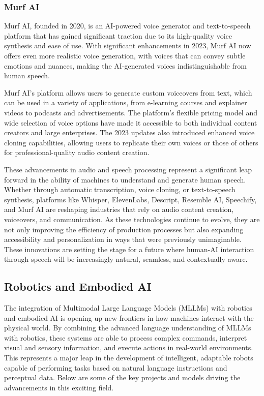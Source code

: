 \subsubsection{Murf AI}

Murf AI, founded in 2020, is an AI-powered voice generator and text-to-speech platform that has gained significant traction due to its high-quality voice synthesis and ease of use. 
With significant enhancements in 2023, Murf AI now offers even more realistic voice generation, with voices that can convey subtle emotions and nuances, making the AI-generated voices indistinguishable from human speech.

Murf AI’s platform allows users to generate custom voiceovers from text, which can be used in a variety of applications, from e-learning courses and explainer videos to podcasts and advertisements. 
The platform’s flexible pricing model and wide selection of voice options have made it accessible to both individual content creators and large enterprises. 
The 2023 updates also introduced enhanced voice cloning capabilities, allowing users to replicate their own voices or those of others for professional-quality audio content creation.

These advancements in audio and speech processing represent a significant leap forward in the ability of machines to understand and generate human speech. 
Whether through automatic transcription, voice cloning, or text-to-speech synthesis, platforms like Whisper, ElevenLabs, Descript, Resemble AI, Speechify, and Murf AI are reshaping industries that rely on audio content creation, voiceovers, and communication. 
As these technologies continue to evolve, they are not only improving the efficiency of production processes but also expanding accessibility and personalization in ways that were previously unimaginable. 
These innovations are setting the stage for a future where human-AI interaction through speech will be increasingly natural, seamless, and contextually aware.

\subsection{Robotics and Embodied AI}

The integration of Multimodal Large Language Models (MLLMs) with robotics and embodied AI is opening up new frontiers in how machines interact with the physical world. 
By combining the advanced language understanding of MLLMs with robotics, these systems are able to process complex commands, interpret visual and sensory information, and execute actions in real-world environments. 
This represents a major leap in the development of intelligent, adaptable robots capable of performing tasks based on natural language instructions and perceptual data. 
Below are some of the key projects and models driving the advancements in this exciting field.

